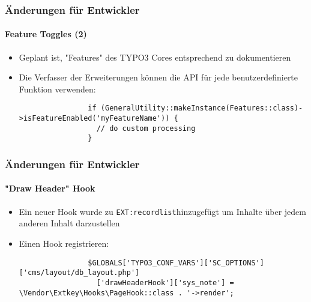 \begin{frame}[fragile]
	\frametitle{Änderungen für Entwickler}
	\framesubtitle{Feature Toggles (2)}

	\lstset{basicstyle=\tiny\ttfamily}

	\begin{itemize}

		\item Geplant ist, "Features" des TYPO3 Cores entsprechend zu dokumentieren

		\item Die Verfasser der Erweiterungen können die API für jede benutzerdefinierte Funktion
			verwenden:

			\begin{lstlisting}
				if (GeneralUtility::makeInstance(Features::class)->isFeatureEnabled('myFeatureName')) {
				  // do custom processing
				}
			\end{lstlisting}

	\end{itemize}

\end{frame}


\begin{frame}[fragile]
	\frametitle{Änderungen für Entwickler}
	\framesubtitle{"Draw Header" Hook}

	\lstset{basicstyle=\tiny\ttfamily}

	\begin{itemize}
		\item Ein neuer Hook wurde zu \texttt{EXT:recordlist}hinzugefügt
			um Inhalte über jedem anderen Inhalt darzustellen

		\item Einen Hook registrieren:

			\begin{lstlisting}
				$GLOBALS['TYPO3_CONF_VARS']['SC_OPTIONS']['cms/layout/db_layout.php']
				  ['drawHeaderHook']['sys_note'] = \Vendor\Extkey\Hooks\PageHook::class . '->render';
			\end{lstlisting}

	\end{itemize}

\end{frame}

